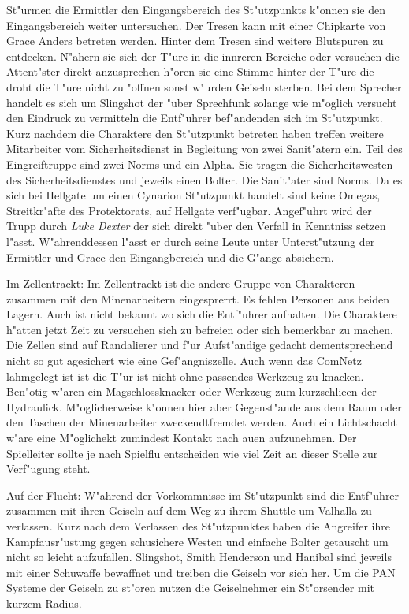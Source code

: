 St"urmen die Ermittler den Eingangsbereich des St"utzpunkts k"onnen sie den Eingangsbereich weiter untersuchen. Der Tresen kann mit einer Chipkarte von Grace Anders betreten werden. Hinter dem Tresen sind weitere Blutspuren zu entdecken. N"ahern sie sich der T"ure in die innreren Bereiche oder versuchen die Attent"ster direkt anzusprechen h"oren sie eine Stimme hinter der T"ure die droht die T"ure nicht zu "offnen sonst w"urden Geiseln sterben. Bei dem Sprecher handelt es sich um Slingshot der "uber Sprechfunk solange wie m"oglich versucht den Eindruck zu vermitteln die Entf"uhrer bef"andenden sich im St"utzpunkt. Kurz nachdem die Charaktere den St"utzpunkt betreten haben treffen  weitere Mitarbeiter vom Sicherheitsdienst in Begleitung von zwei Sanit"atern ein. Teil des Eingreiftruppe sind zwei Norms und ein Alpha. Sie tragen die Sicherheitswesten des Sicherheitsdienstes und jeweils einen Bolter. Die Sanit"ater sind Norms. Da es sich bei Hellgate um einen Cynarion St"utzpunkt handelt sind keine Omegas, Streitkr"afte des Protektorats, auf Hellgate verf"ugbar. Angef"uhrt wird der Trupp durch \emph{Luke Dexter} der sich direkt "uber den Verfall in Kenntniss setzen l"asst. W"ahrenddessen l"asst er durch seine Leute unter Unterst"utzung der Ermittler und Grace den Eingangbereich und die G"ange absichern. 

Im Zellentrackt: Im Zellentrackt ist die andere Gruppe von Charakteren zusammen mit den Minenarbeitern eingesprerrt. Es fehlen Personen aus beiden Lagern. Auch ist nicht bekannt wo sich die Entf"uhrer aufhalten. Die Charaktere h"atten jetzt Zeit zu versuchen sich zu befreien oder sich bemerkbar zu machen. Die Zellen sind auf Randalierer und f"ur Aufst"andige gedacht dementsprechend nicht so gut agesichert wie eine Gef"angniszelle. Auch wenn das ComNetz lahmgelegt ist ist die T"ur ist nicht ohne passendes Werkzeug zu knacken.  Ben"otig w"aren ein Magschlossknacker oder Werkzeug zum kurzschlie\3en der Hydraulick. M"oglicherweise k"onnen hier aber Gegenst"ande aus dem Raum oder den 
Taschen der Minenarbeiter zweckendtfremdet werden. Auch ein Lichtschacht w"are eine M"oglichekt zumindest Kontakt nach au\3en aufzunehmen. 
Der Spielleiter sollte je nach Spielflu\3 entscheiden wie viel Zeit an dieser Stelle zur Verf"ugung steht.

Auf der Flucht: W"ahrend der Vorkommnisse im St"utzpunkt sind die Entf"uhrer zusammen mit ihren Geiseln auf dem Weg zu ihrem Shuttle um Valhalla zu verlassen. Kurz nach dem Verlassen des St"utzpunktes haben die Angreifer ihre Kampfausr"ustung gegen schu\3sichere Westen und einfache Bolter getauscht um nicht so leicht aufzufallen. Slingshot, Smith Henderson und Hanibal sind jeweils mit einer Schu\3waffe bewaffnet und treiben die Geiseln vor sich her. Um die PAN Systeme der Geiseln zu st"oren nutzen die Geiselnehmer ein St"orsender mit kurzem Radius.

